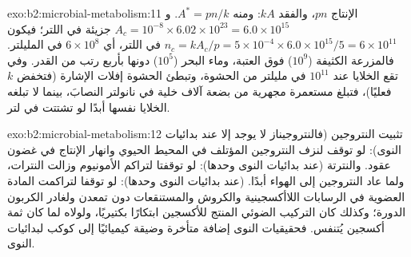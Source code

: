 \begin{solution}{exo:b2:microbial-metabolism:11}
الإنتاج $pn$، والفقد $kA$: ومنه $A^* = pn/k$. و$A_c = 10^{-8}\times
6.02\times 10^{23} = 6.0\times 10^{15}$ جزيئة في اللتر؛ فيكون $n_c =
kA_c/p = 5\times 10^{-4}\times 6.0\times 10^{15}/5 = 6\times 10^{11}$
في اللتر، أي $6\times 10^{8}$ في المليلتر. فالمزرعة الكثيفة
($10^{9}$) فوق العتبة، وماء البحر ($10^{5}$) دونها بأربع رتب من
القدر. وفي  تقع الخلايا عند $10^{11}$ في مليلتر من
الحشوة، وتبطئ الحشوة إفلات الإشارة (فتخفض $k$ فعليًا)، فتبلغ
مستعمرة مجهرية من بضعة آلاف خلية في نانولتر النصابَ، بينما لا تبلغه
الخلايا نفسها أبدًا لو تشتتت في لتر.
\end{solution}

\begin{solution}{exo:b2:microbial-metabolism:12}
تثبيت النتروجين (فالنتروجيناز لا يوجد إلا عند بدائيات النوى): لو
توقف لنزف النتروجين المؤتلف في المحيط الحيوي  وانهار
الإنتاج في غضون عقود. والنترتة  (عند بدائيات النوى
وحدها): لو توقفتا لتراكم الأمونيوم وزالت النترات، ولما عاد
النتروجين إلى الهواء أبدًا.   (عند
بدائيات النوى وحدها): لو توقفا لتراكمت المادة العضوية في الرسابات
اللاأكسجينية والكروش والمستنقعات دون تمعدن ولغادر الكربون الدورة؛
وكذلك كان التركيب الضوئي المنتج للأكسجين ابتكارًا بكتيريًا، ولولاه
لما كان ثمة أكسجين يُتنفس. فحقيقيات النوى إضافة متأخرة وضيقة
كيميائيًا إلى كوكب لبدائيات النوى.
\end{solution}

